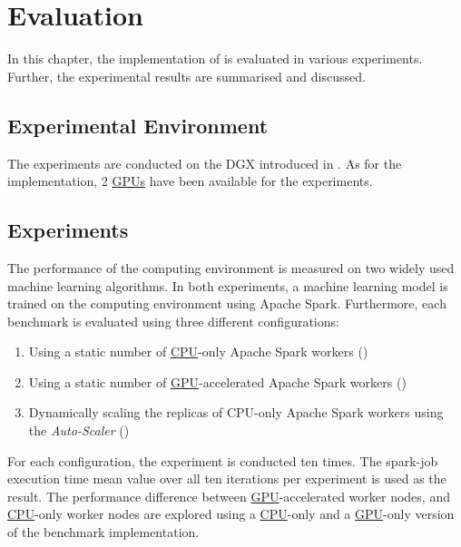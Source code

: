 \chapter{Evaluation}
\label{chap:07_evaluation}

In this chapter, the implementation of  is evaluated in various experiments. Further, the experimental results are summarised and discussed.

\section{Experimental Environment}
%
The experiments are conducted on the DGX introduced in .
As for the implementation, 2 \hyperlink{abbr:gpu}{GPUs} have been available for the experiments.


\section{Experiments}
The performance of the computing environment is measured on two widely used machine learning algorithms.
In both experiments, a machine learning model is trained on the computing environment using Apache Spark. Furthermore, each benchmark is evaluated using three different configurations:
\begin{enumerate}
\item Using a static number of \hyperlink{abbr:cpu}{CPU}-only Apache Spark workers ()
\item Using a static number of \hyperlink{abbr:gpu}{GPU}-accelerated Apache Spark workers ()
\item Dynamically scaling the replicas of CPU-only Apache Spark workers using the \textit{Auto-Scaler} ()
\end{enumerate}
For each configuration, the experiment is conducted ten times. The spark-job execution time mean value over all ten iterations per experiment is used as the result.
The performance difference between \hyperlink{abbr:gpu}{GPU}-accelerated worker nodes, and \hyperlink{abbr:cpu}{CPU}-only worker nodes are explored using a \hyperlink{abbr:cpu}{CPU}-only and a \hyperlink{abbr:gpu}{GPU}-only version of the benchmark implementation.

